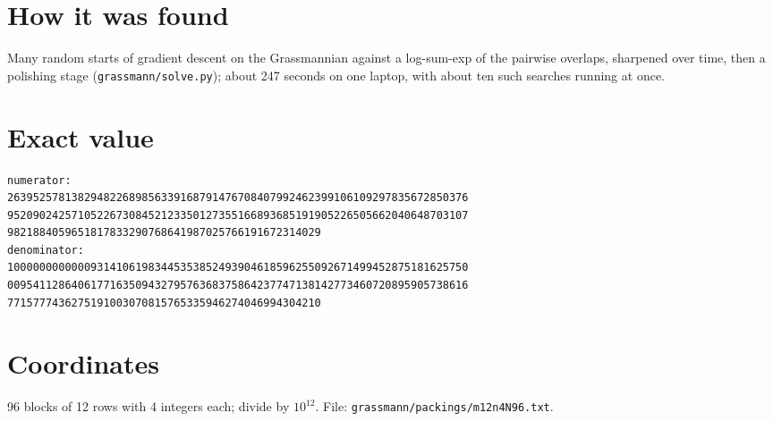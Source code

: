 \documentclass[11pt,a4paper]{article}
\begin{document}
\section{How it was found}
Many random starts of gradient descent on the Grassmannian against a log-sum-exp of the pairwise overlaps, sharpened over time, then a polishing stage (\texttt{grassmann/solve.py}); about 247 seconds on one laptop, with about ten such searches running at once.


\appendix
\section{Exact value}
{\small
\begin{verbatim}
numerator:
263952578138294822689856339168791476708407992462399106109297835672850376
952090242571052267308452123350127355166893685191905226505662040648703107
9821884059651817833290768641987025766191672314029
denominator:
100000000000093141061983445353852493904618596255092671499452875181625750
009541128640617716350943279576368375864237747138142773460720895905738616
7715777436275191003070815765335946274046994304210
\end{verbatim}}

\section{Coordinates}
96 blocks of 12 rows with 4 integers each; divide by $10^{12}$. File: \texttt{grassmann/packings/m12n4N96.txt}.
{\tiny
\begin{multicols}{3}
\end{multicols}}
\end{document}
